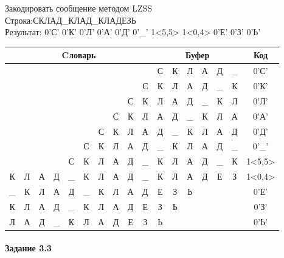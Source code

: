 \documentclass[a4paper, 12pt]{article}
\begin{document}
Закодировать сообщение методом LZSS\\
Строка:СКЛАД\_КЛАД\_КЛАДЕЗЬ\\
Результат: 0'С' 0'К' 0'Л' 0'А' 0'Д' 0'\_' 1<5,5> 1<0,4> 0'Е' 0'З' 0'Ь'\\
\begin{table}[h!]
\centering
\begin{tabular}{|c|c|c|c|c|c|c|c|c|c|c|c|c|c|c|c|c|}
\hline
\multicolumn{10}{|c|}{Cловарь} & \multicolumn{6}{c|}{Буфер} & Код  \\ \hline
  &   &   &   &   &   &   &   &   &   & С & К & Л & А & Д & \_ & 0'С'\\ \hline
  &   &   &   &   &   &   &   &   & С & К & Л & А & Д & \_ & К & 0'К'\\ \hline
  &   &   &   &   &   &   &   & С & К & Л & А & Д & \_ & К & Л & 0'Л'\\ \hline
  &   &   &   &   &   &   & С & К & Л & А & Д & \_ & К & Л & А & 0'А'\\ \hline
  &   &   &   &   &   & С & К & Л & А & Д & \_ & К & Л & А & Д & 0'Д'\\ \hline
  &   &   &   &   & С & К & Л & А & Д & \_ & К & Л & А & Д & \_ & 0'\_'\\ \hline
  &   &   &   & С & \cellcolor[HTML]{FFFF00} К & \cellcolor[HTML]{FFFF00} Л & \cellcolor[HTML]{FFFF00} А & \cellcolor[HTML]{FFFF00} Д & \cellcolor[HTML]{FFFF00} \_ & \cellcolor[HTML]{FFFF00} К & \cellcolor[HTML]{FFFF00} Л & \cellcolor[HTML]{FFFF00} А & \cellcolor[HTML]{FFFF00} Д & \cellcolor[HTML]{FFFF00} \_ & К & 1<5,5>\\ \hline
\cellcolor[HTML]{FFFF00} К & \cellcolor[HTML]{FFFF00} Л & \cellcolor[HTML]{FFFF00} А & \cellcolor[HTML]{FFFF00} Д & \_ & К & Л & А & Д & \_ & \cellcolor[HTML]{FFFF00} К & \cellcolor[HTML]{FFFF00} Л & \cellcolor[HTML]{FFFF00} А & \cellcolor[HTML]{FFFF00} Д & Е & З & 1<0,4>\\ \hline
\_ & К & Л & А & Д & \_ & К & Л & А & Д & Е & З & Ь &   &   &   & 0'Е'\\ \hline
К & Л & А & Д & \_ & К & Л & А & Д & Е & З & Ь &   &   &   &   & 0'З'\\ \hline
Л & А & Д & \_ & К & Л & А & Д & Е & З & Ь &   &   &   &   &   & 0'Ь'\\ \hline
\end{tabular}
\end{table}

\paragraph{Задание 3.3}
\end{document}
